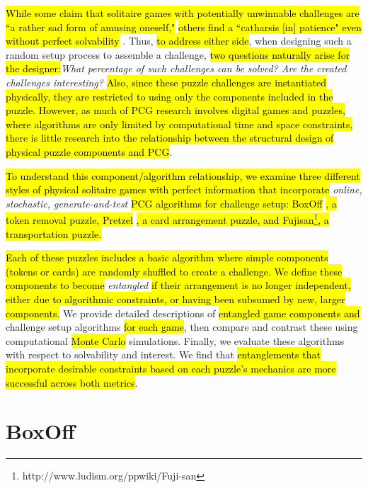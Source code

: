 \documentclass[journal]{IEEEtran}
\begin{document}
\hl{While some claim that solitaire games with potentially unwinnable challenges are ``a rather sad form of amusing oneself,"} \cite{de1981pretzel} \hl{others find a ``catharsis [in] patience" even without perfect solvability} \cite{morehead2014complete}. Thus, \hl{to address either side}, when designing such a random setup process to assemble a challenge, \hl{two questions naturally arise for the designer:}{\it What percentage of such challenges can be solved? Are the created challenges interesting?}\cite{MCPUZZLE} \hl{Also, since these puzzle challenges are instantiated physically, they are restricted to using only the components included in the puzzle. However, as much of PCG research involves digital games and puzzles, where algorithms are only limited by computational time and space constraints, there is little research into the relationship between the structural design of physical puzzle components and PCG}. 

\hl{To understand this component/algorithm relationship, we examine three different styles of physical solitaire games with perfect information that incorporate} {\it online, stochastic, generate-and-test} \hl{PCG algorithms for challenge setup: BoxOff} \cite{BoxOffGAMES} \hl{, a token removal puzzle, Pretzel} \cite{de1981pretzel} \hl{, a card arrangement puzzle, and Fujisan\footnote{http://www.ludism.org/ppwiki/Fuji-san}, a transportation puzzle.}

\hl{Each of these puzzles includes a basic algorithm where simple components (tokens or cards) are randomly shuffled to create a challenge. We define these components to become} {\it entangled} \hl{if their arrangement is no longer independent, either due to algorithmic constraints, or having been subsumed by new, larger components.} We provide detailed descriptions of \hl{entangled game components and} challenge setup algorithms \hl{for each game}, then compare and contrast these using computational \hl{Monte Carlo} simulations. Finally, we evaluate these algorithms with respect to solvability and interest. We find that \hl{entanglements that incorporate desirable constraints based on each puzzle's mechanics are more successful across both metrics}.


\section{BoxOff}
\end{document}
